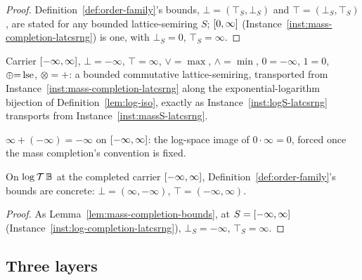 \begin{proof}
\leanok
Definition~\ref{def:order-family}'s bounds, $\bot = (\top_S,\bot_S)$
and $\top = (\bot_S,\top_S)$, are stated for any bounded lattice-semiring
$S$; $[0,\infty]$ (Instance~\ref{inst:mass-completion-latcsrng}) is one,
with $\bot_S = 0$, $\top_S = \infty$.
\end{proof}

\begin{instance}
\label{inst:log-completion-latcsrng}
\leanok
Carrier $[-\infty,\infty]$, $\bot{=}{-\infty}$, $\top{=}\infty$, $\vee{=}\max$,
$\wedge{=}\min$, $0{=}{-\infty}$, $1{=}0$, $\oplus{=}\operatorname{lse}$,
$\otimes{=}{+}$: a bounded commutative lattice-semiring, transported
from Instance~\ref{inst:mass-completion-latcsrng} along the
exponential-logarithm bijection of Definition~\ref{lem:log-iso},
exactly as Instance~\ref{inst:logS-latcsrng} transports from
Instance~\ref{inst:massS-latcsrng}.
\end{instance}

$\infty + (-\infty) = -\infty$ on $[-\infty,\infty]$: the log-space image of
$0 \cdot \infty = 0$, forced once the mass completion's convention is
fixed.

\begin{lemma}
\label{lem:log-completion-bounds}
\leanok
On $\log\mathcal T\,\mathbb B$ at the completed carrier $[-\infty,\infty]$,
Definition~\ref{def:order-family}'s bounds are concrete:
$\bot = (\infty,-\infty)$, $\top = (-\infty,\infty)$.
\end{lemma}

\begin{proof}
\leanok
As Lemma~\ref{lem:mass-completion-bounds}, at
$S = [-\infty,\infty]$ (Instance~\ref{inst:log-completion-latcsrng}),
$\bot_S = -\infty$, $\top_S = \infty$.
\end{proof}

\subsection{Three layers}  %
\label{sec:three-layers}


